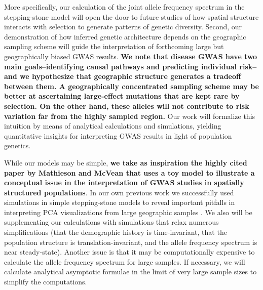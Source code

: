 \documentclass[SpecificAims_and_Proposal]{subfiles}
\begin{document}
More specifically, our calculation of the joint allele frequency spectrum in the stepping-stone model
will open the door to future studies of how spatial structure interacts with
selection to generate patterns of genetic diversity. Second, our demonstration of how inferred genetic architecture depends on the geographic sampling scheme will guide the interpretation of forthcoming large but geographically biased GWAS results. \textbf{We note that disease GWAS have two main goals--identifying causal pathways and predicting individual risk--and we hypothesize that geographic structure generates a tradeoff between them. A geographically concentrated sampling scheme may be better at ascertaining large-effect mutations that are kept rare by selection. On the other hand, these alleles will not contribute to risk variation far from the highly sampled region.} Our work will formalize this intuition by means of analytical calculations and simulations, yielding quantitative insights for interpreting GWAS results in light of population genetics.

While our models may be simple, \textbf{we take as inspiration the highly cited paper by Mathieson and McVean \cite{Mathieson2012} that uses a toy model to illustrate a conceptual issue in the interpretation of GWAS studies in spatially structured populations}. In our own previous work we successfully used simulations in simple stepping-stone models to reveal important pitfalls in interpreting PCA visualizations from large geographic samples \cite{Novembre:2008ek}.  We also will be supplementing our calculations
with simulations that relax numerous simplifications (that the demographic history is time-invariant,
that the population structure is translation-invariant, and the allele frequency spectrum is near steady-state).  Another issue is that it may be computationally expensive to calculate the allele frequency spectrum for large samples. If necessary, we will calculate analytical asymptotic formulae in the limit of very large sample sizes to simplify the computations.
\end{document}
